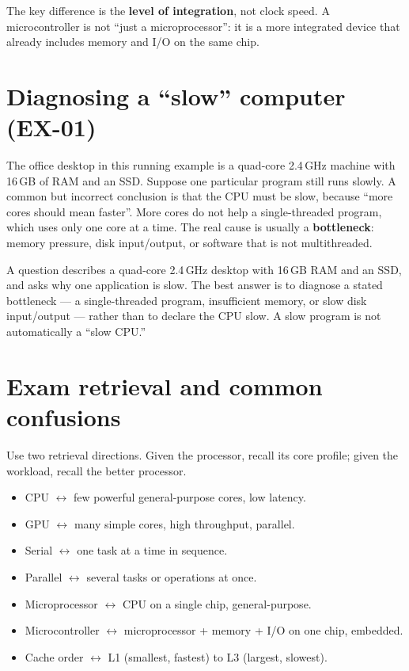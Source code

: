 The key difference is the \textbf{level of integration}, not clock speed. A
microcontroller is not ``just a microprocessor'': it is a more integrated
device that already includes memory and I/O on the same chip.

\section{Diagnosing a ``slow'' computer (EX-01)}
The office desktop in this running example is a quad-core 2.4\,GHz machine
with 16\,GB of RAM and an SSD. Suppose one particular program still runs
slowly. A common but incorrect conclusion is that the CPU must be slow,
because ``more cores should mean faster''. More cores do not help a
single-threaded program, which uses only one core at a time. The real cause is
usually a \textbf{bottleneck}: memory pressure, disk input/output, or software
that is not multithreaded.

\begin{example}
A question describes a quad-core 2.4\,GHz desktop with 16\,GB RAM and an SSD,
and asks why one application is slow. The best answer is to diagnose a stated
bottleneck --- a single-threaded program, insufficient memory, or slow disk
input/output --- rather than to declare the CPU slow. A slow program is not
automatically a ``slow CPU.''
\end{example}

\section{Exam retrieval and common confusions}
Use two retrieval directions. Given the processor, recall its core profile;
given the workload, recall the better processor.
\begin{itemize}
  \item CPU $\leftrightarrow$ few powerful general-purpose cores, low latency.
  \item GPU $\leftrightarrow$ many simple cores, high throughput, parallel.
  \item Serial $\leftrightarrow$ one task at a time in sequence.
  \item Parallel $\leftrightarrow$ several tasks or operations at once.
  \item Microprocessor $\leftrightarrow$ CPU on a single chip, general-purpose.
  \item Microcontroller $\leftrightarrow$ microprocessor + memory + I/O on one
    chip, embedded.
  \item Cache order $\leftrightarrow$ L1 (smallest, fastest) to L3 (largest,
    slowest).
\end{itemize}


